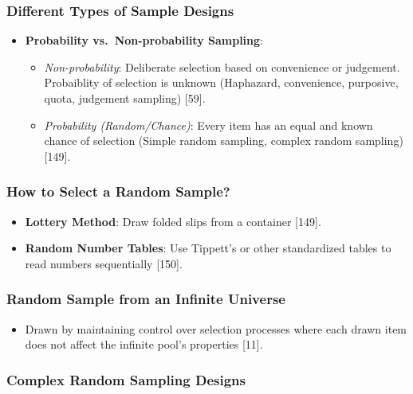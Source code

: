 \documentclass[
]{article}
\providecommand{\tightlist}{%
  \setlength{\itemsep}{0pt}\setlength{\parskip}{0pt}}
\begin{document}
\subsubsection{Different Types of Sample
Designs}\label{different-types-of-sample-designs}

\begin{itemize}
\tightlist
\item
  \textbf{Probability vs.~Non-probability Sampling}:

  \begin{itemize}
  \tightlist
  \item
    \emph{Non-probability}: Deliberate selection based on convenience or
    judgement. Probaiblity of selection is unknown (Haphazard,
    convenience, purposive, quota, judgement sampling) {[}59{]}.
  \item
    \emph{Probability (Random/Chance)}: Every item has an equal and
    known chance of selection (Simple random sampling, complex random
    sampling) {[}149{]}.
  \end{itemize}
\end{itemize}

\subsubsection{How to Select a Random
Sample?}\label{how-to-select-a-random-sample}

\begin{itemize}
\tightlist
\item
  \textbf{Lottery Method}: Draw folded slips from a container {[}149{]}.
\item
  \textbf{Random Number Tables}: Use Tippett's or other standardized
  tables to read numbers sequentially {[}150{]}.
\end{itemize}

\subsubsection{Random Sample from an Infinite
Universe}\label{random-sample-from-an-infinite-universe}

\begin{itemize}
\tightlist
\item
  Drawn by maintaining control over selection processes where each drawn
  item does not affect the infinite pool's properties {[}11{]}.
\end{itemize}

\subsubsection{Complex Random Sampling
Designs}\label{complex-random-sampling-designs}
\end{document}
